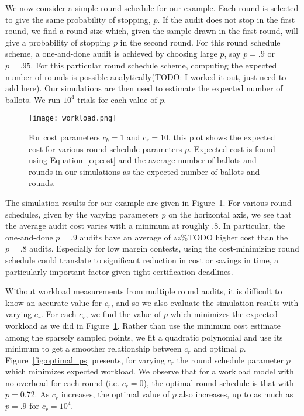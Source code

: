We now consider a simple round schedule for our example. Each round is selected to give the same probability of stopping, $p$. If the audit does not stop in the first round, we find a round size which, given the sample drawn in the first round, will give a probability of stopping $p$ in the second round. For this round schedule scheme, a one-and-done audit is achieved by choosing large $p$, say $p=.9$ or $p=.95$. For this particular round schedule scheme, computing the expected number of rounds is possible analytically(TODO: I worked it out, just need to add here). Our simulations are then used to estimate the expected number of ballots.
We run $10^4$ trials for each value of $p$.

\begin{figure}
\texttt{[image: workload.png]}
\caption{For cost parameters $c_b=1$ and $c_r=10$, this plot shows the expected cost for various round schedule parameters $p$. Expected cost is found using Equation~\ref{eq:cost} and the average number of ballots and rounds in our simulations as the expected number of ballots and rounds.}
\label{fig:workload}
\end{figure}

The simulation results for our example are given in Figure~\ref{fig:workload}. 
For various round schedules, given by the varying parameters $p$ on the horizontal axis, we see that the average audit cost varies with a minimum at roughly $.8$. In particular, the one-and-done $p=.9$ audits have an average of $zz\%$TODO higher cost than the $p=.8$ audits. Especially for low margin contests, using the cost-minimizing round schedule could translate to significant reduction in cost or savings in time, a particularly important factor given tight certification deadlines.

Without workload measurements from multiple round audits, it is difficult to know an accurate value for $c_r$, and so we also evaluate the simulation results with varying $c_r$. 
For each $c_r$, we find the value of $p$ which minimizes the expected workload as we did in Figure~\ref{fig:workload}. Rather than use the minimum cost estimate among the sparsely sampled points, we fit a quadratic polynomial and use its minimum to get a smoother relationship between $c_r$ and optimal $p$. Figure~\ref{fig:optimal_ps} presents, for varying $c_r$ the round schedule parameter $p$ which minimizes expected workload. 
We observe that for a workload model with no overhead for each round (i.e. $c_r=0$), the optimal round schedule is that with $p=0.72$. As $c_r$ increases, the optimal value of $p$ also increases, up to as much as $p=.9$ for $c_r=10^4$.

